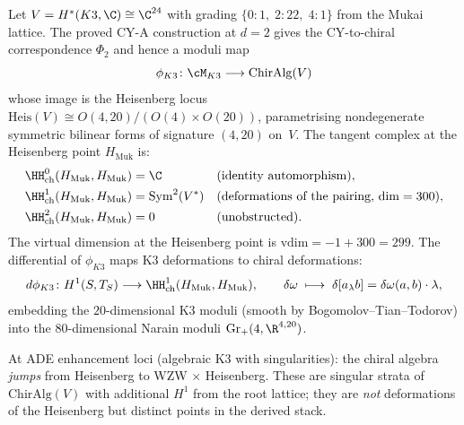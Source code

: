 \begin{conjecture}
\label{conj:derived-stack-k3-moduli-map}
\ClaimStatusConjectured
{}%
Let $V = H^*(K3, \C) \cong \C^{24}$ with grading $\{0: 1,\; 2: 22,\; 4: 1\}$
from the Mukai lattice. The proved CY-A construction at $d = 2$ gives
the CY-to-chiral correspondence $\Phi_2$ and hence a moduli map
\[
 \phi_{K3} \colon \cM_{K3} \longrightarrow \mathrm{ChirAlg}(V)
\]
whose image is the Heisenberg locus
$\mathrm{Heis}(V) \cong O(4, 20) / (O(4) \times O(20))$,
parametrising nondegenerate symmetric bilinear forms of signature
$(4, 20)$ on~$V$. The tangent complex at the Heisenberg point
$H_{\mathrm{Muk}}$ is:
\begin{align}
 \HH^0_{\mathrm{ch}}(H_{\mathrm{Muk}}, H_{\mathrm{Muk}}) &= \C
 && \text{(identity automorphism)}, \notag \\
 \HH^1_{\mathrm{ch}}(H_{\mathrm{Muk}}, H_{\mathrm{Muk}}) &= \mathrm{Sym}^2(V^*)
 && \text{(deformations of the pairing, $\dim = 300$)}, \label{eq:hh1-heis} \\
 \HH^2_{\mathrm{ch}}(H_{\mathrm{Muk}}, H_{\mathrm{Muk}}) &= 0
 && \text{(unobstructed)}. \notag
\end{align}
The virtual dimension at the Heisenberg point is
$\mathrm{vdim} = -1 + 300 = 299$. The differential of $\phi_{K3}$
maps K3 deformations to chiral deformations:
\[
 d\phi_{K3} \colon H^1(S, T_S) \longrightarrow
 \HH^1_{\mathrm{ch}}(H_{\mathrm{Muk}}, H_{\mathrm{Muk}}),
 \qquad
 \delta\omega \;\longmapsto\;
 \delta[a_\lambda b] = \delta\omega(a, b) \cdot \lambda,
\]
embedding the $20$-dimensional K3 moduli
\textup{(}smooth by Bogomolov--Tian--Todorov\textup{)} into the
$80$-dimensional Narain moduli $\mathrm{Gr}_+(4, \R^{4,20})$.

At ADE enhancement loci \textup{(}algebraic K3 with singularities\textup{)}:
the chiral algebra \emph{jumps} from Heisenberg to WZW $\times$
Heisenberg. These are singular strata of $\mathrm{ChirAlg}(V)$ with
additional $H^1$ from the root lattice; they are \emph{not}
deformations of the Heisenberg but distinct points in the derived stack.
\end{conjecture}

